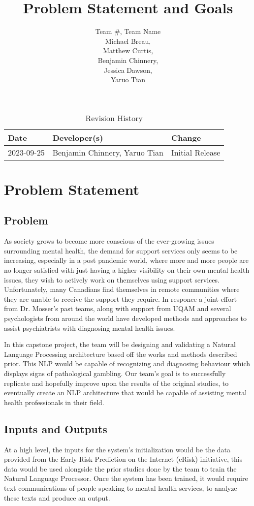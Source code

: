 \documentclass{article}
\title{Problem Statement and Goals\\\progname}
\author{Team \#, Team Name 
\\Michael Breau, \\Matthew Curtis, \\Benjamin Chinnery, \\Jessica Dawson, \\Yaruo Tian}
\date{}
\begin{document}
\maketitle

\begin{table}[hp]
\caption{Revision History} \label{TblRevisionHistory}
\begin{tabularx}{\textwidth}{llX}
\toprule
\textbf{Date} & \textbf{Developer(s)} & \textbf{Change}\\
\midrule
2023-09-25 &  Benjamin Chinnery, Yaruo Tian & Initial Release\\
\bottomrule
\end{tabularx}
\end{table}

\section{Problem Statement}

\subsection{Problem}
As society grows to become more conscious of the ever-growing issues surrounding mental health, the demand for support services only seems to be increasing, especially in a post pandemic world, where more and more people are no longer satisfied with just having a higher visibility on their own mental health issues, they wish to actively work on themselves using support services. Unfortunately, many Canadians find themselves in remote communities where they are unable to receive the support they require. In responce a joint effort from Dr. Mosser's past teams, along with support from UQAM and several psychologists from around the world have developed methods and approaches to assist psychiatrists with diagnosing mental health issues.

In this capstone project, the team will be designing and validating a Natural Language Processing architecture based off the works and methods described prior. This NLP would be capable of recognizing and diagnosing behaviour which displays signs of pathological gambling. Our team's goal is to successfully replicate and hopefully improve upon the results of the original studies, to eventually create an NLP architecture that would be capable of assisting mental health professionals in their field.

\subsection{Inputs and Outputs}
At a high level, the inputs for the system's initialization would be the data provided from the Early Risk Prediction on the Internet (eRisk) initiative, this data would be used alongside the prior studies done by the team to train the Natural Language Processor. Once the system has been trained, it would require text communications of people speaking to mental health services, to analyze these texts and produce an output.
\end{document}
